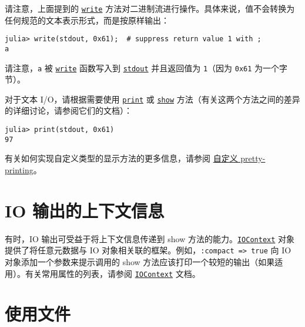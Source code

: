 请注意，上面提到的 \hyperlink{16947913578760238729}{\texttt{write}} 方法对二进制流进行操作。具体来说，值不会转换为任何规范的文本表示形式，而是按原样输出：




\begin{verbatim}
julia> write(stdout, 0x61);  # suppress return value 1 with ;
a
\end{verbatim}



请注意，\texttt{a} 被 \hyperlink{16947913578760238729}{\texttt{write}} 函数写入到 \hyperlink{18181294266083891471}{\texttt{stdout}} 并且返回值为 \texttt{1}（因为 \texttt{0x61} 为一个字节）。



对于文本 I/O，请根据需要使用 \hyperlink{8248717042415202230}{\texttt{print}} 或 \hyperlink{14071376285304310153}{\texttt{show}} 方法（有关这两个方法之间的差异的详细讨论，请参阅它们的文档）：




\begin{verbatim}
julia> print(stdout, 0x61)
97
\end{verbatim}



有关如何实现自定义类型的显示方法的更多信息，请参阅 \hyperlink{5246022684399876238}{自定义 pretty-printing}。



\hypertarget{11059597754503252223}{}


\section{IO 输出的上下文信息}



有时，IO 输出可受益于将上下文信息传递到 show 方法的能力。\hyperlink{13454403377667762339}{\texttt{IOContext}} 对象提供了将任意元数据与 IO 对象相关联的框架。例如，\texttt{:compact => true} 向 IO 对象添加一个参数来提示调用的 show 方法应该打印一个较短的输出（如果适用）。有关常用属性的列表，请参阅 \hyperlink{13454403377667762339}{\texttt{IOContext}} 文档。



\hypertarget{17626527008259433393}{}


\section{使用文件}



